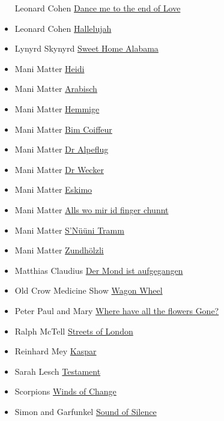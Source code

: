 \documentclass[
]{book}
\begin{document}
\begin{itemize}
  Leonard Cohen \protect\hyperlink{selected-songs-dance-me-to-the-end-of-love}{Dance me to the end of Love}
\item
  Leonard Cohen \protect\hyperlink{selected-songs-hallelujah}{Hallelujah}
\item
  Lynyrd Skynyrd \protect\hyperlink{classics-sweet-home-alabama}{Sweet Home Alabama}
\item
  Mani Matter \protect\hyperlink{mundart-und-deutsch-heidi}{Heidi}
\item
  Mani Matter \protect\hyperlink{mundart-und-deutsch-arabisch}{Arabisch}
\item
  Mani Matter \protect\hyperlink{mundart-und-deutsch-hemmige}{Hemmige}
\item
  Mani Matter \protect\hyperlink{mundart-und-deutsch-bim-coiffeur}{Bim Coiffeur}
\item
  Mani Matter \protect\hyperlink{mundart-und-deutsch-dr-alpeflug}{Dr Alpeflug}
\item
  Mani Matter \protect\hyperlink{mundart-und-deutsch-dr-wecker}{Dr Wecker}
\item
  Mani Matter \protect\hyperlink{mundart-und-deutsch-eskimo}{Eskimo}
\item
  Mani Matter \protect\hyperlink{mundart-und-deutsch-alls-wo-mir-id-finger-chunnt}{Alls wo mir id finger chunnt}
\item
  Mani Matter \protect\hyperlink{mundart-und-deutsch-nueni-tramm}{S'Nüüni Tramm}
\item
  Mani Matter \protect\hyperlink{mundart-und-deutsch-s-zundhoelzli}{Zundhölzli}
\item
  Matthias Claudius \protect\hyperlink{mundart-und-deutsch-der-mond}{Der Mond ist aufgegangen}
\item
  Old Crow Medicine Show \protect\hyperlink{selected-songs-wagon-wheel}{Wagon Wheel}
\item
  Peter Paul and Mary \protect\hyperlink{classics-where-have-all-the-flowers-gone}{Where have all the flowers Gone?}
\item
  Ralph McTell \protect\hyperlink{classics-streets-of-london}{Streets of London}
\item
  Reinhard Mey \protect\hyperlink{mundart-und-deutsch-kaspar}{Kaspar}
\item
  Sarah Lesch \protect\hyperlink{mundart-und-deutsch-das-testament}{Testament}
\item
  Scorpions \protect\hyperlink{classics-wind-of-change}{Winds of Change}
\item
  Simon and Garfunkel \protect\hyperlink{classics-sound-of-silence}{Sound of Silence}

\end{itemize}
\end{document}
